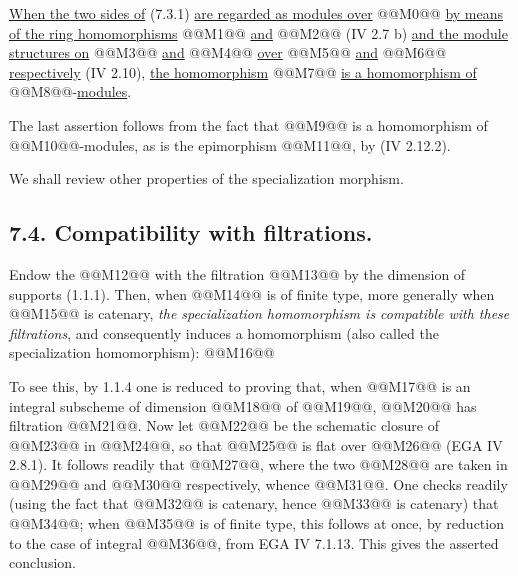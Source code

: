 
\noindent \uline{When the two sides of} (7.3.1) \uline{are regarded as modules over} @@M0@@ \uline{by means of the ring homomorphisms} @@M1@@ \uline{and} @@M2@@ (IV 2.7 b) \uline{and the module structures on} @@M3@@ \uline{and} @@M4@@ \uline{over} @@M5@@ \uline{and} @@M6@@ \uline{respectively} (IV 2.10), \uline{the homomorphism} @@M7@@ \uline{is a homomorphism of} @@M8@@-\uline{modules}.

The last assertion follows from the fact that @@M9@@ is a homomorphism of @@M10@@-modules, as is the epimorphism @@M11@@, by (IV 2.12.2).

We shall review other properties of the specialization morphism.

\subsection*{7.4. Compatibility with filtrations.}
Endow the @@M12@@ with the filtration @@M13@@ by the dimension of supports (1.1.1). Then, when @@M14@@ is of finite type, more generally when @@M15@@ is catenary, \emph{the specialization homomorphism is compatible with these filtrations}, and consequently induces a homomorphism (also called the specialization homomorphism):
@@M16@@

To see this, by 1.1.4 one is reduced to proving that, when @@M17@@ is an integral subscheme of dimension @@M18@@ of @@M19@@, @@M20@@ has filtration @@M21@@. Now let @@M22@@ be the schematic closure of @@M23@@ in @@M24@@, so that @@M25@@ is flat over @@M26@@ (EGA IV 2.8.1). It follows readily that @@M27@@, where the two @@M28@@ are taken in @@M29@@ and @@M30@@ respectively, whence @@M31@@. One checks readily (using the fact that @@M32@@ is catenary, hence @@M33@@ is catenary) that @@M34@@; when @@M35@@ is of finite type, this follows at once, by reduction to the case of integral @@M36@@, from EGA IV 7.1.13. This gives the asserted conclusion.

